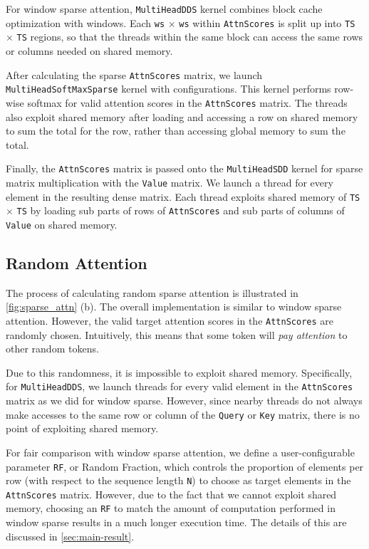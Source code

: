 \documentclass[11pt]{article}
\begin{document}
For window sparse attention, \texttt{MultiHeadDDS} kernel combines block cache optimization with windows. Each \texttt{ws} $\times$ \texttt{ws} within \texttt{AttnScores} is split up into \texttt{TS} $\times$ \texttt{TS} regions, so that the threads within the same block can access the same rows or columns needed on shared memory.

After calculating the sparse \texttt{AttnScores} matrix, we launch \texttt{MultiHeadSoftMaxSparse} kernel with configurations. This kernel performs row-wise softmax for valid attention scores in the \texttt{AttnScores} matrix. The threads also exploit shared memory after loading and accessing a row on shared memory to sum the total for the row, rather than accessing global memory to sum the total.

Finally, the \texttt{AttnScores} matrix is passed onto the \texttt{MultiHeadSDD} kernel for sparse matrix multiplication with the \texttt{Value} matrix. We launch a thread for every element in the resulting dense matrix. Each thread exploits shared memory of \texttt{TS} $\times$ \texttt{TS} by loading sub parts of rows of \texttt{AttnScores} and sub parts of columns of \texttt{Value} on shared memory.

\subsection{Random Attention}
\label{sec:random-attn}
The process of calculating random sparse attention is illustrated in \autoref{fig:sparse_attn} (b). The overall implementation is similar to window sparse attention. However, the valid target attention scores in the \texttt{AttnScores} are randomly chosen. Intuitively, this means that some token will \textit{pay attention} to other random tokens. 

Due to this randomness, it is impossible to exploit shared memory. Specifically, for \texttt{MultiHeadDDS}, we launch threads for every valid element in the \texttt{AttnScores} matrix as we did for window sparse. However, since nearby threads do not always make accesses to the same row or column of the \texttt{Query} or \texttt{Key} matrix, there is no point of exploiting shared memory.

For fair comparison with window sparse attention, we define a user-configurable parameter \texttt{RF}, or Random Fraction, which controls the proportion of elements per row (with respect to the sequence length \texttt{N}) to choose as target elements in the \texttt{AttnScores} matrix. However, due to the fact that we cannot exploit shared memory, choosing an \texttt{RF} to match the amount of computation performed in window sparse results in a much longer execution time. The details of this are discussed in \autoref{sec:main-result}.
\end{document}
